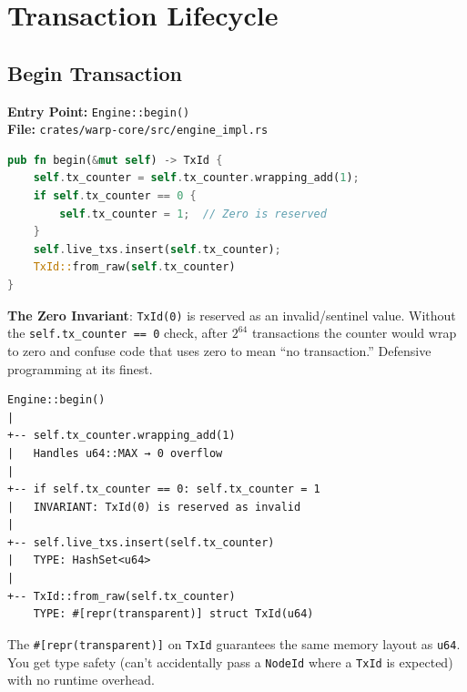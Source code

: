 
\chapter{Transaction Lifecycle}
\label{chap:tour-transaction}

\section{Begin Transaction}

\textbf{Entry Point:} \texttt{Engine::begin()} \\
\textbf{File:} \texttt{crates/warp-core/src/engine\_impl.rs}

\begin{lstlisting}[language=Rust]
pub fn begin(&mut self) -> TxId {
    self.tx_counter = self.tx_counter.wrapping_add(1);
    if self.tx_counter == 0 {
        self.tx_counter = 1;  // Zero is reserved
    }
    self.live_txs.insert(self.tx_counter);
    TxId::from_raw(self.tx_counter)
}
\end{lstlisting}

\begin{watchout}
\textbf{The Zero Invariant}: \texttt{TxId(0)} is reserved as an invalid/sentinel value. Without the \texttt{self.tx\_counter == 0} check, after $2^{64}$ transactions the counter would wrap to zero and confuse code that uses zero to mean ``no transaction.'' Defensive programming at its finest.
\end{watchout}

\begin{verbatim}
Engine::begin()
|
+-- self.tx_counter.wrapping_add(1)
|   Handles u64::MAX → 0 overflow
|
+-- if self.tx_counter == 0: self.tx_counter = 1
|   INVARIANT: TxId(0) is reserved as invalid
|
+-- self.live_txs.insert(self.tx_counter)
|   TYPE: HashSet<u64>
|
+-- TxId::from_raw(self.tx_counter)
    TYPE: #[repr(transparent)] struct TxId(u64)
\end{verbatim}

\begin{commentary}
The \texttt{\#[repr(transparent)]} on \texttt{TxId} guarantees the same memory layout as \texttt{u64}. You get type safety (can't accidentally pass a \texttt{NodeId} where a \texttt{TxId} is expected) with no runtime overhead.
\end{commentary}

